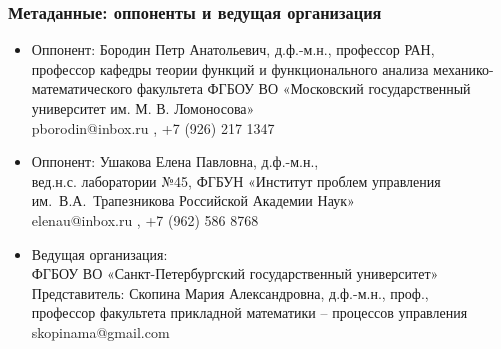\begin{frame}\frametitle{Метаданные: оппоненты и ведущая организация}
	\label{page:metadata}
	\begin{itemize}
		\item
			Оппонент: Бородин Петр Анатольевич, д.ф.-м.н., профессор РАН,
			\\
			профессор кафедры теории функций и функционального анализа механико-математического факультета
			ФГБОУ ВО «Московский государственный университет им. М. В. Ломоносова»
			\\
			pborodin@inbox.ru , +7 (926) 217 1347
		\item
			Оппонент: Ушакова Елена Павловна, д.ф.-м.н.,
			\\
			вед.н.с. лаборатории №45,
			ФГБУН «Институт проблем управления им.~В.А.~Трапезникова Российской Академии Наук»
			\\
			elenau@inbox.ru , +7 (962) 586 8768
		\item
			Ведущая организация:
			\\
			ФГБОУ ВО «Санкт-Петербургский государственный университет»
			\\
			Представитель:
			Скопина Мария Александровна, д.ф.-м.н., проф.,
			\\
			профессор факультета прикладной математики -- процессов управления
			\\
			skopinama@gmail.com
	\end{itemize}
\end{frame}

